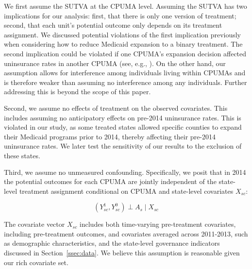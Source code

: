 \documentclass[aoas]{imsart}
\theoremstyle{plain}
\theoremstyle{remark}
\begin{document}
We first assume the SUTVA at the CPUMA level. Assuming the SUTVA has two implications for our analysis: first, that there is only one version of treatment; second, that each unit's potential outcome only depends on its treatment assignment. We discussed potential violations of the first implication previously when considering how to reduce Medicaid expansion to a binary treatment. The second implication could be violated if one CPUMA's expansion decision affected uninsurance rates in another CPUMA (see, e.g., \cite{frean2017premium}). On the other hand, our assumption allows for interference among individuals living within CPUMAs and is therefore weaker than assuming no interference among any individuals. Further addressing this is beyond the scope of this paper.

Second, we assume no effects of treatment on the observed covariates. This includes assuming no anticipatory effects on pre-2014 uninsurance rates. This is violated in our study, as some treated states allowed specific counties to expand their Medicaid programs prior to 2014, thereby affecting their pre-2014 uninsurance rates. We later test the sensitivity of our results to the exclusion of these states.

Third, we assume no unmeasured confounding. Specifically, we posit that in 2014 the potential outcomes for each CPUMA are jointly independent of the state-level treatment assignment conditional on CPUMA and state-level covariates $X_{sc}$:

\begin{equation}\label{eqn:unconfoundedness}
(Y_{sc}^1, Y_{sc}^0) \perp A_s \mid X_{sc} 
\end{equation}

The covariate vector $X_{sc}$ includes both time-varying pre-treatment covariates, including pre-treatment outcomes, and covariates averaged across 2011-2013, such as demographic characteristics, and the state-level governance indicators discussed in Section~\ref{ssec:data}. We believe this assumption is reasonable given our rich covariate set. 
\end{document}
